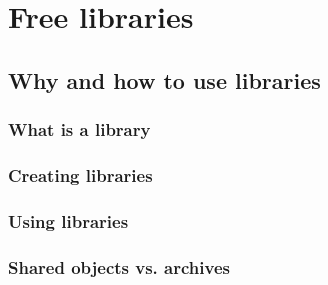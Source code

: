 
\chapter{Free libraries}
\label{free_libraries}

\section{Why and how to use libraries}
\label{why_libraries}

\subsection{What is a library}

\subsection{Creating libraries}

\subsection{Using libraries}

\subsection{Shared objects vs. archives}
